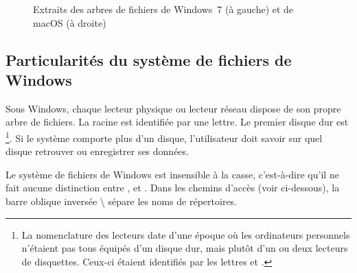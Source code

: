 \begin{figure}
  \begin{minipage}[t]{0.45\linewidth}
  \end{minipage}
  \hfill
  \begin{minipage}[t]{0.45\linewidth}
  \end{minipage}
  \caption[Extraits de la hiérarchie des systèmes de fichiers]{%
    Extraits des arbres de fichiers de Windows~7 (à gauche) et de
    macOS (à droite)}
  \label{fig:informatique:fs}
\end{figure}

\subsection{Particularités du système de fichiers de Windows}
\label{sec:informatique:fs:windows}

Sous Windows, chaque lecteur physique ou lecteur réseau dispose de son
propre arbre de fichiers. La racine est identifiée par une lettre. Le
premier disque dur est \footnote{%
  La nomenclature des lecteurs date d'une époque où les ordinateurs
  personnels n'étaient pas tous équipés d'un disque dur, mais plutôt
  d'un ou deux lecteurs de disquettes. Ceux-ci étaient identifiés par
  les lettres  et .}. %
Si le système comporte plus d'un disque, l'utilisateur doit savoir sur
quel disque retrouver ou enregistrer ses données.

Le système de fichiers de Windows est insensible à la casse,
c'est-à-dire qu'il ne fait aucune distinction entre ,  et . Dans les
chemins d'accès (voir ci-dessous), la barre oblique inversée
{\textbackslash} sépare les noms de répertoires.


